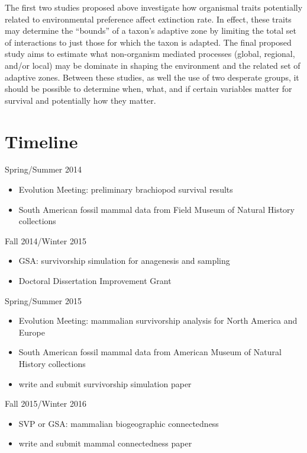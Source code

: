 \documentclass[12pt,letterpaper]{article}
\begin{document}
The first two studies proposed above investigate how organismal traits potentially related to environmental preference affect extinction rate. In effect, these traits may determine the ``bounds'' of a taxon's adaptive zone by limiting the total set of interactions to just those for which the taxon is adapted. The final proposed study aims to estimate what non-organism mediated processes (global, regional, and/or local) may be dominate in shaping the environment and the related set of adaptive zones. Between these studies, as well the use of two desperate groups, it should be possible to determine when, what, and if certain variables matter for survival and potentially how they matter. 



\clearpage
\section{Timeline}

Spring/Summer 2014
\begin{itemize}
  \item Evolution Meeting: preliminary brachiopod survival results
  \item South American fossil mammal data from Field Museum of Natural History collections
\end{itemize}

Fall 2014/Winter 2015
\begin{itemize}
  \item GSA: survivorship simulation for anagenesis and sampling
  \item Doctoral Dissertation Improvement Grant
\end{itemize}

Spring/Summer 2015
\begin{itemize}
  \item Evolution Meeting: mammalian survivorship analysis for North America and Europe
  \item South American fossil mammal data from American Museum of Natural History collections
  \item write and submit survivorship simulation paper
\end{itemize}

Fall 2015/Winter 2016
\begin{itemize}
  \item SVP or GSA: mammalian biogeographic connectedness
  \item write and submit mammal connectedness paper
\end{itemize}
\end{document}
